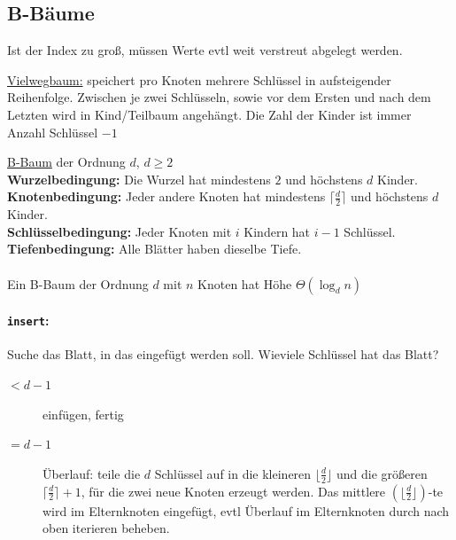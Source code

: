 \documentclass{scrartcl}
\begin{document}
{\Huge {}}

\subsection{B-Bäume}
Ist der Index zu groß, müssen Werte evtl weit verstreut abgelegt werden. \\

\begin{shaded}
\underline{Vielwegbaum:} speichert pro Knoten mehrere Schlüssel in aufsteigender Reihenfolge. Zwischen je zwei Schlüsseln, sowie vor dem Ersten und nach dem Letzten wird in Kind/Teilbaum angehängt. Die Zahl der Kinder ist immer Anzahl Schlüssel $-1$

\underline{B-Baum} der Ordnung $d$, $d\geq 2$ \\
\textbf{Wurzelbedingung:} Die Wurzel hat mindestens $2$ und höchstens $d$ Kinder. \\
\textbf{Knotenbedingung:} Jeder andere Knoten hat mindestens $\lceil \frac{d}{2}\rceil$ und höchstens $d$ Kinder. \\
\textbf{Schlüsselbedingung:} Jeder Knoten mit $i$ Kindern hat $i-1$ Schlüssel. \\
\textbf{Tiefenbedingung:} Alle Blätter haben dieselbe Tiefe. \\ \ \\
Ein B-Baum der Ordnung $d$ mit $n$ Knoten hat Höhe $\Theta(\log_d n)$
\end{shaded}

\paragraph{\texttt{insert}:} Suche das Blatt, in das eingefügt werden soll. Wieviele Schlüssel hat das Blatt?
\begin{description}
	\item[$<d-1$] einfügen, fertig
	\item[$=d-1$] Überlauf: teile die $d$ Schlüssel auf in die kleineren $\lfloor \frac{d}{2} \rfloor$ und die größeren $\lceil \frac{d}{2} \rceil+1$, für die zwei neue Knoten erzeugt werden. Das mittlere $(\lfloor \frac{d}{2} \rfloor)$-te wird im Elternknoten eingefügt, evtl Überlauf im Elternknoten durch nach oben iterieren beheben.
\end{description}
\end{document}

